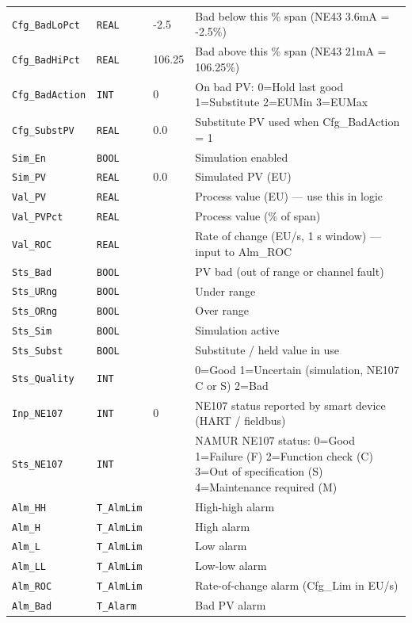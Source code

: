 \begin{small}
\begin{longtable}{@{}P{3.70cm}P{2.20cm}P{1.70cm}P{8.91cm}@{}}
\texttt{Cfg\_BadLoPct} & \texttt{REAL} & -2.5 & Bad below this \% span (NE43 3.6mA = -2.5\%) \\
\texttt{Cfg\_BadHiPct} & \texttt{REAL} & 106.25 & Bad above this \% span (NE43 21mA = 106.25\%) \\
\texttt{Cfg\_BadAction} & \texttt{INT} & 0 & On bad PV: 0=Hold last good 1=Substitute 2=EUMin 3=EUMax \\
\texttt{Cfg\_SubstPV} & \texttt{REAL} & 0.0 & Substitute PV used when Cfg\_BadAction = 1 \\
\texttt{Sim\_En} & \texttt{BOOL} &  & Simulation enabled \\
\texttt{Sim\_PV} & \texttt{REAL} & 0.0 & Simulated PV (EU) \\
\texttt{Val\_PV} & \texttt{REAL} &  & Process value (EU) --- use this in logic \\
\texttt{Val\_PVPct} & \texttt{REAL} &  & Process value (\% of span) \\
\texttt{Val\_ROC} & \texttt{REAL} &  & Rate of change (EU/\allowbreak{}s, 1 s window) --- input to Alm\_ROC \\
\texttt{Sts\_Bad} & \texttt{BOOL} &  & PV bad (out of range or channel fault) \\
\texttt{Sts\_URng} & \texttt{BOOL} &  & Under range \\
\texttt{Sts\_ORng} & \texttt{BOOL} &  & Over range \\
\texttt{Sts\_Sim} & \texttt{BOOL} &  & Simulation active \\
\texttt{Sts\_Subst} & \texttt{BOOL} &  & Substitute /\allowbreak{} held value in use \\
\texttt{Sts\_Quality} & \texttt{INT} &  & 0=Good 1=Uncertain (simulation, NE107 C or S) 2=Bad \\
\texttt{Inp\_NE107} & \texttt{INT} & 0 & NE107 status reported by smart device (HART /\allowbreak{} fieldbus) \\
\texttt{Sts\_NE107} & \texttt{INT} &  & NAMUR NE107 status: 0=Good 1=Failure (F) 2=Function check (C) 3=Out of specification (S) 4=Maintenance required (M) \\
\texttt{Alm\_HH} & \texttt{T\_AlmLim} &  & High-high alarm \\
\texttt{Alm\_H} & \texttt{T\_AlmLim} &  & High alarm \\
\texttt{Alm\_L} & \texttt{T\_AlmLim} &  & Low alarm \\
\texttt{Alm\_LL} & \texttt{T\_AlmLim} &  & Low-low alarm \\
\texttt{Alm\_ROC} & \texttt{T\_AlmLim} &  & Rate-of-change alarm (Cfg\_Lim in EU/\allowbreak{}s) \\
\texttt{Alm\_Bad} & \texttt{T\_Alarm} &  & Bad PV alarm \\
\bottomrule
\end{longtable}
\end{small}

